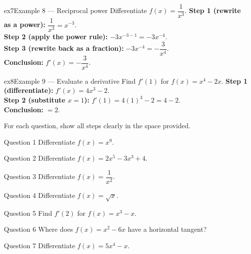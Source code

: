 \documentclass[11pt]{article}
\begin{document}
\begin{example}{ex7}{Example 8 --- Reciprocal power}
Differentiate $f(x)=\dfrac1{x^3}$.\soln
\textbf{Step 1 (rewrite as a power):} $\dfrac1{x^3}=x^{-3}$.\\[3pt]
\textbf{Step 2 (apply the power rule):} $-3x^{-3-1}=-3x^{-4}$.\\[3pt]
\textbf{Step 3 (rewrite back as a fraction):} $-3x^{-4}=-\dfrac3{x^4}$.\\[3pt]
\textbf{Conclusion:} $f'(x)=-\dfrac3{x^4}$.
\end{example}

\begin{example}{ex8}{Example 9 --- Evaluate a derivative}
Find $f'(1)$ for $f(x)=x^4-2x$.\soln
\textbf{Step 1 (differentiate):} $f'(x)=4x^3-2$.\\[3pt]
\textbf{Step 2 (substitute $x=1$):} $f'(1)=4(1)^3-2=4-2$.\\[3pt]
\textbf{Conclusion:} $=2$.
\end{example}

\clearpage
{}
For each question, show all steps clearly in the space provided.

\begin{qbox}{Question 1}
Differentiate $f(x)=x^9$.\workspace{2.4cm}
\end{qbox}

\begin{qbox}{Question 2}
Differentiate $f(x)=2x^5-3x^3+4$.\workspace{2.4cm}
\end{qbox}

\begin{qbox}{Question 3}
Differentiate $f(x)=\dfrac1{x^2}$.\workspace{2.4cm}
\end{qbox}

\begin{qbox}{Question 4}
Differentiate $f(x)=\sqrt{x}$.\workspace{2.4cm}
\end{qbox}

\begin{qbox}{Question 5}
Find $f'(2)$ for $f(x)=x^3-x$.\workspace{2.4cm}
\end{qbox}

\begin{qbox}{Question 6}
Where does $f(x)=x^2-6x$ have a horizontal tangent?\workspace{2.4cm}
\end{qbox}

\begin{qbox}{Question 7}
Differentiate $f(x)=5x^4-x$.\workspace{2.4cm}
\end{qbox}
\end{document}
